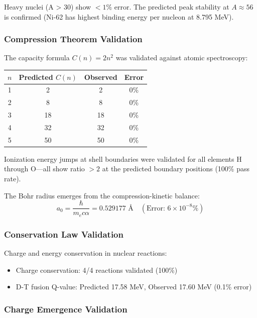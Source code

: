 \documentclass[twocolumn,10pt,a4paper]{article}
\theoremstyle{definition}
\theoremstyle{remark}
\begin{document}
Heavy nuclei (A > 30) show $<1\%$ error. The predicted peak stability at $A \approx 56$ is confirmed (Ni-62 has highest binding energy per nucleon at 8.795 MeV).

\subsubsection{Compression Theorem Validation}

The capacity formula $C(n) = 2n^2$ was validated against atomic spectroscopy:

\begin{center}
\begin{tabular}{cccc}
\toprule
$n$ & Predicted $C(n)$ & Observed & Error \\
\midrule
1 & 2 & 2 & 0\% \\
2 & 8 & 8 & 0\% \\
3 & 18 & 18 & 0\% \\
4 & 32 & 32 & 0\% \\
5 & 50 & 50 & 0\% \\
\bottomrule
\end{tabular}
\end{center}

Ionization energy jumps at shell boundaries were validated for all elements H through O---all show ratio $>2$ at the predicted boundary positions (100\% pass rate).

The Bohr radius emerges from the compression-kinetic balance:
\begin{equation}
    a_0 = \frac{\hbar}{m_e c \alpha} = 0.529177 \text{ \AA} \quad (\text{Error: } 6 \times 10^{-8}\%)
\end{equation}

\subsubsection{Conservation Law Validation}

Charge and energy conservation in nuclear reactions:
\begin{itemize}
    \item Charge conservation: 4/4 reactions validated (100\%)
    \item D-T fusion Q-value: Predicted 17.58 MeV, Observed 17.60 MeV (0.1\% error)
\end{itemize}

\subsubsection{Charge Emergence Validation}
\end{document}
